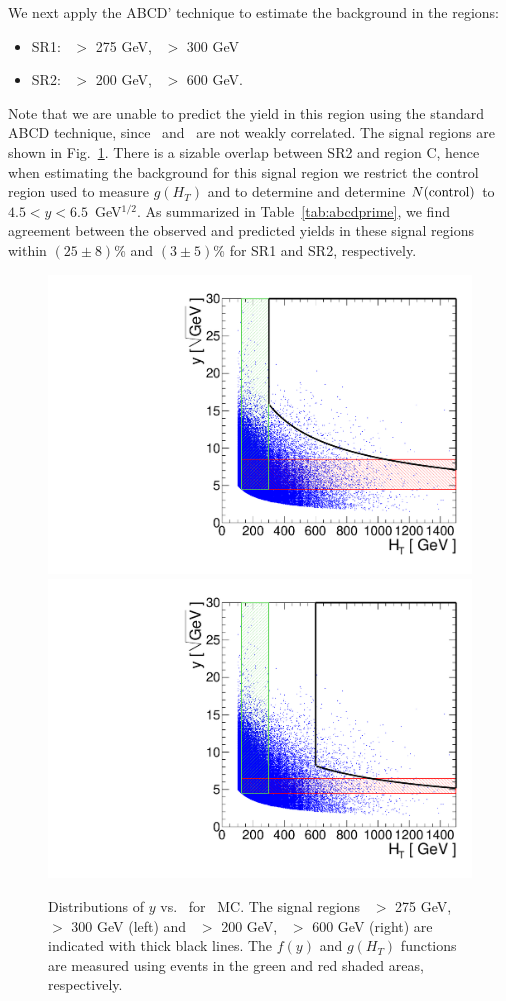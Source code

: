 We next apply the ABCD' technique to estimate the background in the regions:

\begin{itemize}
\item SR1: \met\ $>$ 275 GeV, \Ht\ $>$ 300 GeV
\item SR2: \met\ $>$ 200 GeV, \Ht\ $>$ 600 GeV. 
\end{itemize}

Note that we are unable to predict the yield in this region using
the standard ABCD technique, since \met\ and \Ht\ are not weakly correlated. The signal
regions are shown in Fig.~\ref{fig:abcdprime_met}. There is a sizable overlap between
SR2 and region C, hence when estimating the background for this signal region we
restrict the control region used to measure $g(H_T)$ and to determine and determine $N({\rm control})$ 
to $4.5 < y < 6.5$~GeV$^{1/2}$.
As summarized in Table~\ref{tab:abcdprime}, we find agreement between the observed and
predicted yields in these signal regions within $(25 \pm 8)$\% and $(3 \pm 5)$\% for SR1 and SR2, respectively. 

\begin{figure}[hbt]
\begin{center}
\includegraphics[width=0.48\linewidth]{plots/abcdprime_met275_ht300.pdf}
\includegraphics[width=0.48\linewidth]{plots/abcdprime_met200_ht600.pdf}
\caption{\label{fig:abcdprime_met}\protect 
Distributions of $y$ vs. \Ht\ for \ttbar\ MC. The signal regions \met\ $>$ 275 GeV, \Ht\ $>$ 300 GeV (left)
and \met\ $>$ 200 GeV, \Ht\ $>$ 600 GeV (right) are indicated with thick black lines. The $f(y)$ and $g(H_T)$ 
functions are measured using events in the green and red shaded areas, respectively.
}
\end{center}
\end{figure}


